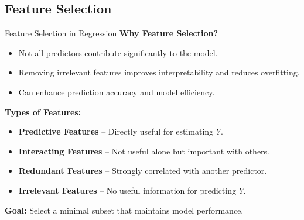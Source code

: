 \documentclass[aspectratio=169,xcolor=dvipsnames]{beamer}
\begin{document}

\subsection{Feature Selection}
\begin{frame}{Feature Selection in Regression}
    \textbf{Why Feature Selection?}
    \begin{itemize}
        \item Not all predictors contribute significantly to the model.
        \item Removing irrelevant features improves interpretability and reduces overfitting.
        \item Can enhance prediction accuracy and model efficiency.
    \end{itemize}

    \bigskip

    \textbf{Types of Features:}
    \begin{itemize}
        \item \textbf{Predictive Features} – Directly useful for estimating \( Y \).
        \item \textbf{Interacting Features} – Not useful alone but important with others.
        \item \textbf{Redundant Features} – Strongly correlated with another predictor.
        \item \textbf{Irrelevant Features} – No useful information for predicting \( Y \).
    \end{itemize}

    \bigskip

    \textbf{Goal:} Select a minimal subset that maintains model performance.
\end{frame}

\end{document}
